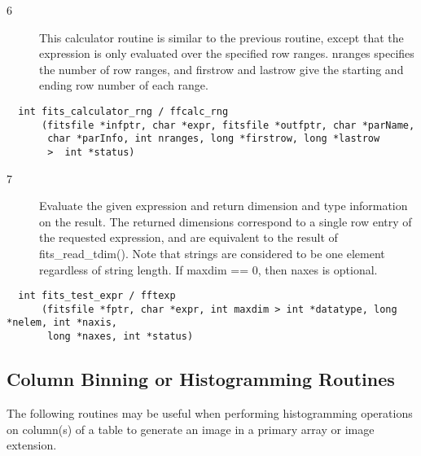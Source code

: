 \documentclass[11pt]{book}
\begin{document}
\begin{description}
\item[6 ] This calculator routine is similar to the previous routine, except
that the expression is only evaluated over the specified
row ranges.  nranges specifies the number of row ranges, and firstrow
and lastrow give the starting and ending row number of each range. \label{ffcalcrng}
\end{description}

\begin{verbatim}
  int fits_calculator_rng / ffcalc_rng
      (fitsfile *infptr, char *expr, fitsfile *outfptr, char *parName,
       char *parInfo, int nranges, long *firstrow, long *lastrow
       >  int *status)
\end{verbatim}

\begin{description}
\item[7 ]Evaluate the given expression and return dimension and type information
on the result.  The returned dimensions correspond to a single row entry
of the requested expression, and are equivalent to the result of fits\_read\_tdim().
Note that strings are considered to be one element regardless of string length.
If maxdim == 0, then naxes is optional. \label{fftexp}
\end{description}

\begin{verbatim}
  int fits_test_expr / fftexp
      (fitsfile *fptr, char *expr, int maxdim > int *datatype, long *nelem, int *naxis,
       long *naxes, int *status)
\end{verbatim}


\subsection{Column Binning or Histogramming Routines}

The following routines may be useful when performing histogramming operations on
column(s) of a table to generate an image in a primary array or image extension.
\end{document}
